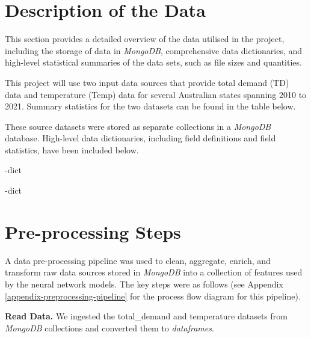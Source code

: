 \documentclass[mstat,12pt]{unswthesis}
\begin{document}
\hypertarget{description-of-the-data}{%
\section{Description of the Data}\label{description-of-the-data}}
This section provides a detailed overview of the data utilised in the project, including the storage of data in \textit{MongoDB}, comprehensive data dictionaries, and high-level statistical summaries of the data sets, such as file sizes and quantities. \newline

This project will use two input data sources that provide total demand (TD) data and temperature (Temp) data for several Australian states spanning 2010 to 2021. Summary statistics for the two datasets can be found in the table below.

 \metadata

These source datasets were stored as separate collections in a \textit{MongoDB} database. High-level data dictionaries, including field definitions and field statistics, have been included below.

\begin{landscape}

     \tdemand-dict

     \temp-dict
    
\end{landscape}

\hypertarget{pre-processing-steps}{%
\section{Pre-processing Steps}\label{pre-processing-steps}}

A data pre-processing pipeline was used to clean, aggregate, enrich, and transform raw data sources stored in \textit{MongoDB} into a collection of features used by the neural network models. The key steps were as follows (see Appendix \ref{appendix-preprocessing-pipeline} for the process flow diagram for this pipeline).

\textbf{Read Data.} We ingested the total\_demand and temperature datasets from \textit{MongoDB} collections and converted them to \textit{dataframes}.
\end{document}
